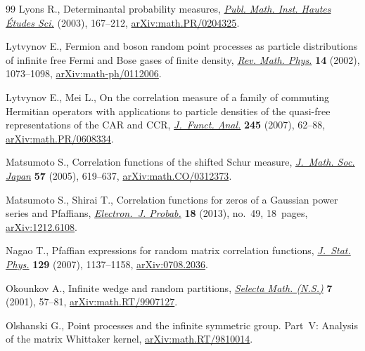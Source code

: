 \documentclass[11pt]{article}
\numberwithin{equation}{section}
\numberwithin{equation}{section}
\begin{document}
\begin{thebibliography}{99}
Lyons R., Determinantal probability measures, \href{https://doi.org/10.1007/s10240-003-0016-0}{\textit{Publ. Math. Inst. Hautes
 \'Etudes Sci.}} (2003), 167--212, \href{https://arxiv.org/abs/math.PR/0204325}{arXiv:math.PR/0204325}.

Lytvynov E., Fermion and boson random point processes as particle distributions
 of infinite free {F}ermi and {B}ose gases of finite density, \href{https://doi.org/10.1142/S0129055X02001533}{\textit{Rev.
 Math. Phys.}} \textbf{14} (2002), 1073--1098, \href{https://arxiv.org/abs/math-ph/0112006}{arXiv:math-ph/0112006}.

Lytvynov E., Mei L., On the correlation measure of a family of commuting
 {H}ermitian operators with applications to particle densities of the
 quasi-free representations of the {CAR} and {CCR}, \href{https://doi.org/10.1016/j.jfa.2006.12.017}{\textit{J.~Funct. Anal.}}
 \textbf{245} (2007), 62--88, \href{https://arxiv.org/abs/math.PR/0608334}{arXiv:math.PR/0608334}.

Matsumoto S., Correlation functions of the shifted {S}chur measure,
 \href{https://doi.org/10.2969/jmsj/1158241925}{\textit{J.~Math. Soc. Japan}} \textbf{57} (2005), 619--637,
 \href{https://arxiv.org/abs/math.CO/0312373}{arXiv:math.CO/0312373}.

Matsumoto S., Shirai T., Correlation functions for zeros of a {G}aussian power
 series and {P}faffians, \href{https://doi.org/10.1214/EJP.v18-2545}{\textit{Electron.~J. Probab.}} \textbf{18} (2013),
 no.~49, 18~pages, \href{https://arxiv.org/abs/1212.6108}{arXiv:1212.6108}.

Nagao T., Pfaffian expressions for random matrix correlation functions,
 \href{https://doi.org/10.1007/s10955-007-9415-9}{\textit{J.~Stat. Phys.}} \textbf{129} (2007), 1137--1158, \href{https://arxiv.org/abs/0708.2036}{arXiv:0708.2036}.

Okounkov A., Infinite wedge and random partitions, \href{https://doi.org/10.1007/PL00001398}{\textit{Selecta Math.
 (N.S.)}} \textbf{7} (2001), 57--81, \href{https://arxiv.org/abs/math.RT/9907127}{arXiv:math.RT/9907127}.

Olshanski G., Point processes and the infinite symmetric group. Part~V:
 Analysis of the matrix Whittaker kernel, \href{https://arxiv.org/abs/math.RT/9810014}{arXiv:math.RT/9810014}.


\end{thebibliography}
\end{document}
